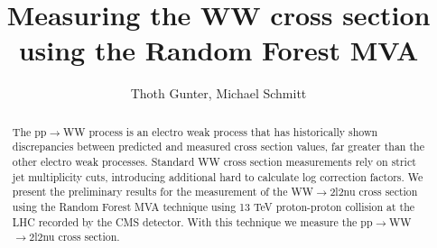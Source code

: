 \documentclass{article}
\begin{document}
\title{Measuring the WW cross section using the Random Forest MVA}
\author{Thoth Gunter, Michael Schmitt}

\maketitle

\begin{abstract}
The pp$\rightarrow$WW process is an electro weak process that has historically shown discrepancies between predicted and measured cross section values, far greater than the other electro weak processes. Standard WW cross section measurements rely on strict jet multiplicity cuts, introducing additional hard to calculate log correction factors. We present the preliminary results for the measurement of the WW$\rightarrow$2l2nu cross section using the Random Forest MVA technique using 13 TeV proton-proton collision at the LHC recorded by the CMS detector.  With this technique we measure the pp$\rightarrow$WW$\rightarrow$2l2nu cross section.
\end{abstract}
\end{document}
